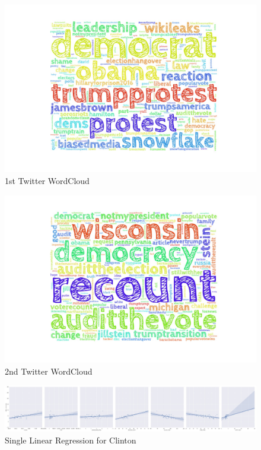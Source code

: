 \documentclass{article}
\begin{document}
{\begin{figure}[!h]
  \centering
    \includegraphics[scale=0.2]{TwitterAnalysis1}
  \caption{1st Twitter WordCloud}
\end{figure}  

\begin{figure}[!h]
  \centering
    \includegraphics[scale=0.2]{TwitterAnalysis2}
  \caption{2nd Twitter WordCloud}
\end{figure}

\begin{figure}[!h]
  \centering
    \includegraphics[scale=0.3]{HillarySLR}
  \caption{Single Linear Regression for Clinton}
\end{figure}

}
\end{document}

